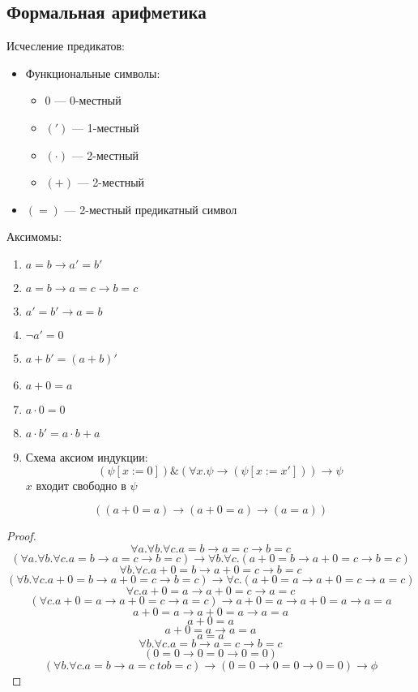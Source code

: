 \documentclass[oneside]{book}
\begin{document}
\subsection{Формальная арифметика}
\label{sec:orge3011a6}
\begin{definition}
	Исчесление предикатов:
	\begin{itemize}
		\item Функциональные символы:
		      \begin{itemize}
			      \item \(0\) --- 0-местный
			      \item \((')\) --- 1-местный
			      \item \((\cdot)\) --- 2-местный
			      \item \((+)\) --- 2-местный
		      \end{itemize}
		\item \((=)\) --- 2-местный предикатный символ
	\end{itemize}
	Аксимомы:
	\begin{enumerate}
		\item \(a = b \to a' = b'\)
		\item \(a = b \to a = c \to b = c\)
		\item \(a' = b' \to a= b\)
		\item \(\neg a' = 0\)
		\item \(a + b' = (a + b)'\)
		\item \(a + 0 = a\)
		\item \(a\cdot 0 = 0\)
		\item \(a\cdot b' = a\cdot b + a\)
		\item Схема аксиом индукции:
		      \[ (\psi[x:=0])\&(\forall x. \psi \to (\psi[x:=x'])) \to \psi \]
		      \(x\) входит свободно в \(\psi\)
	\end{enumerate}
\end{definition}
\beginproperty
\begin{property}
	\[ ((a + 0 = a) \to (a + 0 = a) \to (a = a)) \]
\end{property}
\begin{proof}
	\[ \forall a. \forall b. \forall c. a = b \to a = c \to b = c \]
	\[ (\forall a. \forall b. \forall c. a = b \to a = c \to b = c) \to \forall b. \forall c. (a + 0 = b \to a + 0 = c \to b = c) \]
	\[ \forall b. \forall c. a + 0 = b \to a + 0 = c\to b = c \]
	\[ (\forall b. \forall c. a + 0 = b \to a + 0 = c \to b = c) \to \forall c.(a + 0 = a \to a + 0 = c \to a=c) \]
	\[ \forall c. a + 0 = a \to a + 0 = c \to a = c \]
	\[ (\forall c. a + 0 = a \to a + 0 = c \to a = c) \to a+0 = a \to a + 0 = a \to a= a \]
	\[ a + 0  = a \to a + 0 = a \to a = a \]
	\[ a + 0 = a \]
	\[ a + 0 = a \to a = a \]
	\[ a = a \]
	\[ \forall b. \forall c. a = b \to a = c \to b = c \]
	\[ (0 = 0 \to 0 = 0 \to 0 = 0) \]
	\[ (\forall b. \forall c. a = b \to a = c\ to b = c) \to (0 = 0 \to 0 = 0 \to 0 = 0) \to \phi \]
	\fixme
\end{proof}
\end{document}
